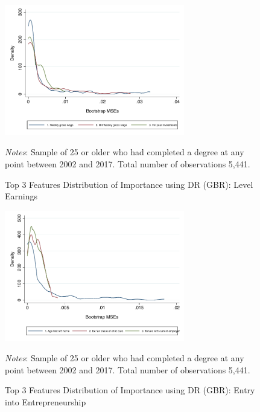 \documentclass[12pt, a4paper]{article}
\begin{document}
\begin{figure}[H]
\centering
\caption{Top 3 Features Distribution of Importance using DR (GBR): Level Earnings}
\vspace{0.5cm}
  \label{fig:dengbrlevDR} 
    \includegraphics[width=0.7\textwidth]{_figures/density_GBR_le_100_top3_DR.pdf}
\parbox{1\textwidth}{\footnotesize{\textit{Notes}: Sample of 25 or older who had completed a degree at any point between 2002 and 2017. Total number of observations 5,441.}}
\end{figure}

\begin{figure}[H]
\centering
\caption{Top 3 Features Distribution of Importance using DR (GBR): Entry into Entrepreneurship}
\vspace{0.5cm}
  \label{fig:dengbrlevDRe} 
    \includegraphics[width=0.7\textwidth]{_figures/density_GBR_chself_100_top3_DR.pdf}
\parbox{1\textwidth}{\footnotesize{\textit{Notes}: Sample of 25 or older who had completed a degree at any point between 2002 and 2017. Total number of observations 5,441.}}
\end{figure}

%
\end{document}
